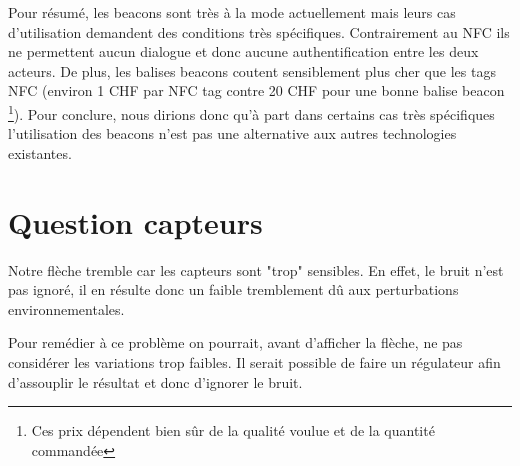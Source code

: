 \documentclass[12pt]{article}
\begin{document}
Pour résumé, les beacons sont très à la mode actuellement mais leurs cas d'utilisation demandent des conditions très spécifiques. Contrairement au NFC ils ne permettent aucun dialogue et donc aucune authentification entre les deux acteurs. De plus, les balises beacons coutent sensiblement plus cher que les tags NFC (environ 1 CHF par NFC tag contre 20 CHF pour une bonne balise beacon \footnote{Ces prix dépendent bien sûr de la qualité voulue et de la quantité commandée}). 
Pour conclure, nous dirions donc qu'à part dans certains cas très spécifiques l'utilisation des beacons n'est pas une alternative aux autres technologies existantes.
\section*{Question capteurs}

Notre flèche tremble car les capteurs sont "trop" sensibles. En effet, le bruit n'est pas ignoré, il en résulte donc un faible tremblement dû aux perturbations environnementales.

Pour remédier à ce problème on pourrait, avant d'afficher la flèche, ne pas considérer les variations trop faibles. Il serait possible de faire un régulateur afin d'assouplir le résultat et donc d'ignorer le bruit.
\end{document}
